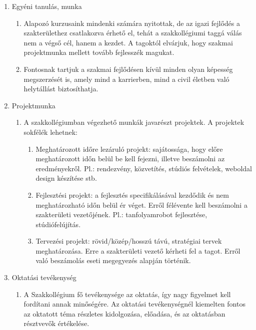 \documentclass[12pt]{report}
\begin{document}
\begin{enumerate}
  \item Egyéni tanulás, munka
  \begin{enumerate}
    \item Alapozó kurzusaink mindenki számára nyitottak, de az igazi fejlődés a szakterülethez csatlakozva érhető el, tehát a szakkollégiumi taggá válás nem a végső cél, 
      hanem a kezdet. A tagoktól elvárjuk, hogy szakmai projektmunka mellett tovább fejlesszék magukat.
    \item Fontosnak tartjuk a szakmai fejlődésen kívül minden olyan képesség megszerzését is, amely mind a karrierben, mind a civil életben való helytállást biztosíthatja.
  \end{enumerate}

  \item Projektmunka
  \begin{enumerate}
    \item A szakkollégiumban végezhető munkák javarészt projektek. A projektek sokfélék lehetnek:
    \begin{enumerate}
      \item Meghatározott időre lezáruló projekt: sajátossága, hogy előre meghatározott időn belül be kell fejezni, illetve beszámolni az eredményekről. Pl.: rendezvény, 
        közvetítés, stúdiós felvételek, weboldal design készítése stb.
      \item Fejlesztési projekt: a fejlesztés specifikálásával kezdődik és nem meghatározható időn belül ér véget. Erről félévente kell beszámolni a szakterületi vezetőjének. 
        Pl.: tanfolyamrobot fejlesztése, stúdiófelújítás.
      \item Tervezési projekt: rövid/közép/hosszú távú, stratégiai tervek meghatározása. Erre a szakterületi vezető kérheti fel a tagot. Erről való beszámolás eseti 
        megegyezés alapján történik.
      \end{enumerate}
  \end{enumerate}

  \item Oktatási tevékenység
  \begin{enumerate}
    \item A Szakkollégium fő tevékenysége az oktatás, így nagy figyelmet kell fordítani annak minőségére. Az oktatási tevékenységnél kiemelten fontos az oktatott téma 
      részletes kidolgozása, előadása, és az oktatásban résztvevők értékelése.
  \end{enumerate}


\end{enumerate}
\end{document}
